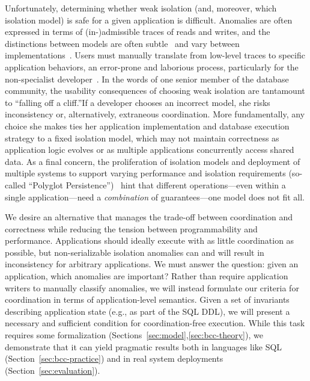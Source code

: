 Unfortunately, determining whether weak isolation (and, moreover,
which isolation model) is safe for a given application is
difficult. Anomalies are often expressed in terms of (in-)admissible
traces of reads and writes, and the distinctions between models are
often subtle~\cite{adya-isolation,isolation-semantics} and vary
between implementations~\cite{hat-vldb}. Users must manually translate
from low-level traces to specific application behaviors, an
error-prone and laborious process, particularly for the non-specialist
developer~\cite{consistency-borders}. In the words of one senior
member of the database community, the usability consequences of
choosing weak isolation are tantamount to ``falling off a cliff.''If a
developer chooses an incorrect model, she risks inconsistency or,
alternatively, extraneous coordination. More fundamentally, any choice
she makes ties her application implementation and database execution
strategy to a fixed isolation model, which may not maintain
correctness as application logic evolves or as multiple applications
concurrently access shared data. As a final concern, the proliferation
of isolation models and deployment of multiple systems to support
varying performance and isolation requirements (so-called ``Polyglot
Persistence'')~\cite{polyglot} hint that different operations---even
within a single application---need a \textit{combination} of
guarantees---one model does not fit all.



 We desire an alternative
that manages the trade-off between coordination and correctness while
reducing the tension between programmability and
performance. Applications should ideally execute with as little
coordination as possible, but non-serializable isolation anomalies can
and will result in inconsistency for arbitrary applications. We must
answer the question: given an application, which anomalies are
important? Rather than require application writers to manually
classify anomalies, we will instead formulate our criteria for
coordination in terms of application-level semantics. Given a set of
invariants describing application state (e.g., as part of the SQL
DDL), we will present a necessary and sufficient condition for
coordination-free execution. While this task requires some
formalization (Sections~\ref{sec:model},\ref{sec:bcc-theory}), we
demonstrate that it can yield pragmatic results both in languages like
SQL (Section~\ref{sec:bcc-practice}) and in real system deployments
(Section~\ref{sec:evaluation}).




